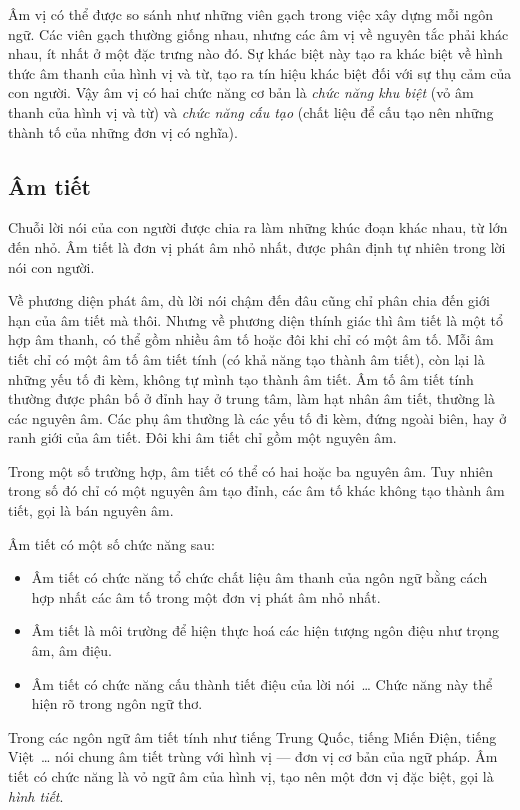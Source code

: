 \documentclass[a4paper,oneside,14pt]{extbook} %
\begin{document}
Âm vị có thể được so sánh như những viên gạch trong việc xây dựng mỗi
ngôn ngữ. Các viên gạch thường giống nhau, nhưng các âm vị về nguyên
tắc phải khác nhau, ít nhất ở một đặc trưng nào đó. Sự khác biệt này
tạo ra khác biệt về hình thức âm thanh của hình vị và từ, tạo ra tín
hiệu khác biệt đối với sự thụ cảm của con người. Vậy âm vị có hai chức
năng cơ bản là {\em chức năng khu biệt} (vỏ âm thanh của hình vị và
từ) và {\em chức năng cấu tạo} (chất liệu để cấu tạo nên
những thành tố của những đơn vị có nghĩa).


\subsection{Âm tiết}

Chuỗi lời nói của con người được chia ra làm những khúc đoạn khác
nhau, từ lớn đến nhỏ. Âm tiết là đơn vị phát âm nhỏ nhất, được phân
định tự nhiên trong lời nói con người.

Về phương diện phát âm, dù lời nói chậm đến đâu cũng chỉ phân chia đến
giới hạn của âm tiết mà thôi. Nhưng về phương diện thính giác thì âm
tiết là một tổ hợp âm thanh, có thể gồm nhiều âm tố hoặc đôi khi chỉ
có một âm tố. Mỗi âm tiết chỉ có một âm tố âm tiết tính (có khả năng
tạo thành âm tiết), còn lại là những yếu tố đi kèm, không tự mình tạo
thành âm tiết. Âm tố âm tiết tính thường được phân bố ở đỉnh hay ở
trung tâm, làm hạt nhân âm tiết, thường là các nguyên âm. Các phụ âm
thường là các yếu tố đi kèm, đứng ngoài biên, hay ở ranh giới của âm
tiết. Đôi khi âm tiết chỉ gồm một nguyên âm.

Trong một số trường hợp, âm tiết có thể có hai hoặc ba nguyên âm. Tuy
nhiên trong số đó chỉ có một nguyên âm tạo đỉnh, các âm tố khác không
tạo thành âm tiết, gọi là bán nguyên âm.

Âm tiết có một số chức năng sau:
\begin{itemize}
\item Âm tiết có chức năng tổ chức chất liệu âm thanh của ngôn ngữ
  bằng cách hợp nhất các âm tố trong một đơn vị phát âm nhỏ nhất.
\item Âm tiết là môi trường để hiện thực hoá các hiện tượng ngôn điệu
  như trọng âm, âm điệu.
\item Âm tiết có chức năng cấu thành tiết điệu của lời nói~\ldots{} Chức
  năng này thể hiện rõ trong ngôn ngữ thơ.
\end{itemize}

Trong các ngôn ngữ âm tiết tính như tiếng Trung Quốc, tiếng Miến Điện,
tiếng Việt~\ldots{} nói chung âm tiết trùng với hình vị --- đơn vị cơ
bản của ngữ pháp. Âm tiết có chức năng là vỏ ngữ âm của hình vị, tạo
nên một đơn vị đặc biệt, gọi là {\em hình tiết}.
\end{document}
